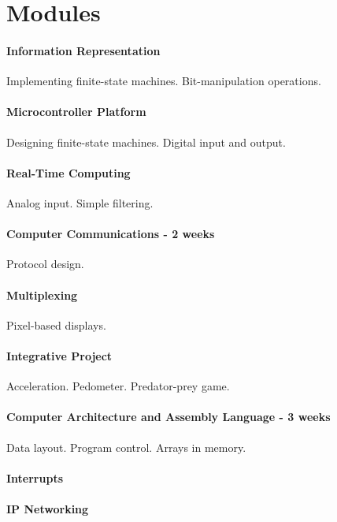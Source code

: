 \section{Modules}
\label{sec:weeks}


\paragraph{Information Representation} Implementing finite-state machines.
Bit-manipulation operations.

\paragraph{Microcontroller Platform} Designing finite-state machines.
Digital input and output.

\paragraph{Real-Time Computing} Analog input. Simple filtering.

\paragraph{Computer Communications - 2 weeks} Protocol design.

\paragraph{Multiplexing} Pixel-based displays.

\paragraph{Integrative Project} Acceleration. Pedometer. Predator-prey game.

\paragraph{Computer Architecture and Assembly Language - 3 weeks} Data layout.
Program control. Arrays in memory.


\paragraph{Interrupts}

\paragraph{IP Networking}
